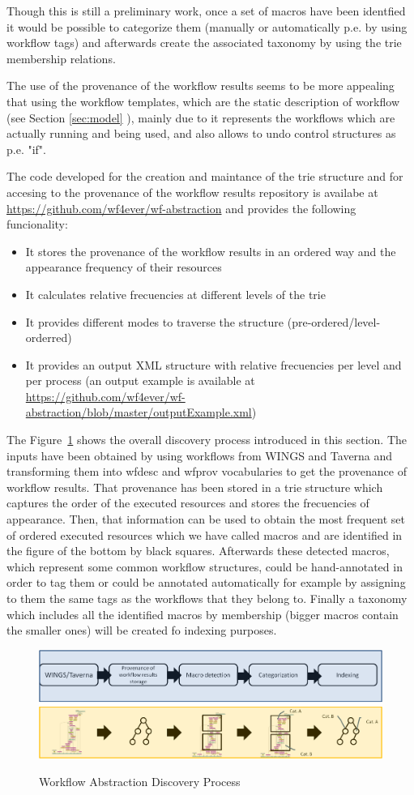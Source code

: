 Though this is still a preliminary work, once a set of macros have been identfied it would be possible to categorize them (manually or automatically p.e. by using workflow tags) and afterwards create the associated taxonomy by using the trie membership relations.

The use of the provenance of the workflow results seems to be more appealing that using the workflow templates, which are the static description of workflow (see Section \ref{sec:model} ), mainly due to it represents the workflows which are actually running and being used, and also allows to undo control structures as p.e. "if".

The code developed for the creation and maintance of the trie structure and for accesing to the provenance of the workflow results repository is availabe at \url{https://github.com/wf4ever/wf-abstraction} and provides the following funcionality:

\begin{itemize}
\item It stores the provenance of the workflow results in an ordered way and the appearance frequency of their resources
\item It calculates relative frecuencies at different levels of the trie
\item It provides different modes to traverse the structure (pre-ordered/level-orderred)
\item It provides an output XML structure with relative frecuencies per level and per process (an output example is available at \url{https://github.com/wf4ever/wf-abstraction/blob/master/outputExample.xml})
\end{itemize}

The Figure~\ref{fig:workflowAbstraction} shows the overall discovery process introduced in this section. The inputs have been obtained by using workflows from WINGS and Taverna and transforming them into wfdesc and wfprov vocabularies to get the provenance of workflow results. That provenance has been stored in a trie structure which captures the order of the executed resources and stores the frecuencies of appearance. Then, that information can be used to obtain the most frequent set of ordered executed resources which we have called macros and are identified in the figure of the bottom by black squares. Afterwards these detected macros, which represent some common workflow structures, could be hand-annotated in order to tag them or could be annotated automatically for example by assigning to them the same tags as the workflows that they belong to. Finally a taxonomy which includes all the identified macros by membership (bigger macros contain the smaller ones) will be created fo indexing purposes.

\begin{figure}
\begin{center}
\label{fig:workflowAbstraction}
\includegraphics[scale=0.5]{./Figures/workflowAbstraction}
\caption{Workflow Abstraction Discovery Process}
\end{center}
\end{figure}